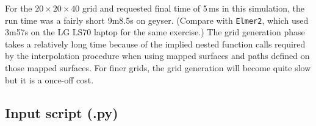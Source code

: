 \medskip
For the $20 \times 20 \times 40$ grid and requested final time of 5\,ms 
in this simulation, the run time was a fairly short 9m8.5s on geyser.
(Compare with \texttt{Elmer2}, which used 3m57s on the LG LS70 laptop for the same exercise.)
The grid generation phase takes a relatively long time because of the implied nested function calls
required by the interpolation procedure when using mapped surfaces and paths 
defined on those mapped surfaces.
For finer grids, the grid generation will become quite slow but it is a
once-off cost.

\newpage
\subsection{Input script (.py)}
\topbar

\bottombar
